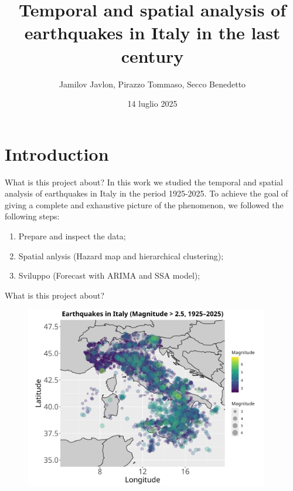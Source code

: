 \documentclass[aspectratio=43]{beamer}
\title{Temporal and spatial analysis of earthquakes in Italy in the last century\\}
\subtitle{}
\author[]{Jamilov Javlon, Pirazzo Tommaso, Secco Benedetto}
\date{14 luglio 2025}
\begin{document}
\frame{\titlepage}

\section{Introduction}

\begin{frame}{What is this project about?}
	In this work we studied the temporal and spatial analysis of earthquakes in Italy in the period 1925-2025. 
	To achieve the goal of giving a complete and exhaustive picture of the phenomenon, we followed the following steps:\pause
	
	\vspace*{1cm}
	
	\begin{enumerate}
		\item Prepare and inspect the data;\pause
			\vspace*{0.5cm}
		\item Spatial anlysis (Hazard map and hierarchical clustering);\pause
			\vspace*{0.5cm}
		\item Sviluppo (Forecast with ARIMA and SSA model);\pause
	\end{enumerate}
\end{frame}

\begin{frame}{What is this project about?}
	\begin{figure}[h]
		\centering
		\includegraphics[width=0.95\textwidth]{EQ_images/all_earthquakes.png}
	\end{figure}
\end{frame}
\end{document}
